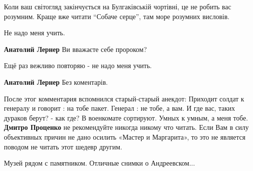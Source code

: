 \begin{itemize}
\begin{itemize}
\end{itemize} %

Коли ваш світогляд закінчується на
Булгаківській
чортівні, це не
робить вас розумним.
Краще вже читати \enquote{Собаче серце}, там море
розумних висловів.

\begin{itemize} %
Не надо меня учить.

\textbf{Анатолий Лернер}
Ви вважаєте себе пророком?

Ещё раз вежливо повторяю - не надо меня учить.

\textbf{Анатолий Лернер}
Без коментарів.

После этог комментария вспомнился старый-старый анекдот:
Приходит солдат к генералу и говорит : на тобе пакет.
Генерал : не тобе, а вам. И где вас, таких дураков берут?
- как где? В военкомате сортируют. Умных к умным, а меня тобе.
\textbf{Дмитро Проценко} не рекомендуйте никогда никому что читать. Если Вам в силу объективных причин не дано осилить «Мастер и Маргарита», то это не является поводом не читать этот шедевр другим.
\end{itemize} %

Музей рядом с памятником. Отличные снимки о Андреевском...

\end{itemize} %
